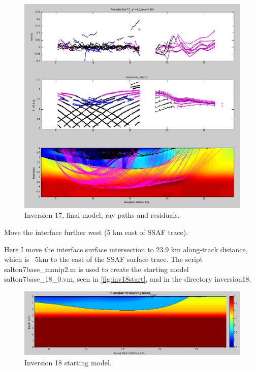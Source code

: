 \documentclass[fontsize=11pt, %
                             paper=a4, %
                             twoside, %
                             captions=tableheading,
                             index=totoc,
                             hyperref]{labbook}
\begin{document}
\begin{addmargin}[4cm]{0cm}
\begin{figure}[h!]
\raggedleft
\includegraphics[scale=0.5,keepaspectratio=true]{figs/Inv17FinRay.png}
\caption{Inversion 17, final model, ray paths and residuals.}
\label{fig:inv17ray}
\end{figure}



\clearpage{}


Move the interface further west (5 km east of SSAF trace).

Here I move the interface surface intersection to 23.9 km along-track distance, which is ~5km to the east of the SSAF surface trace.  The script salton7base\_manip2.m is used to create the starting model salton7base\_18\_0.vm, seen in \autoref{fig:inv18start}, and in the directory inversion18.  

\begin{figure}[h!]
\raggedleft
\includegraphics[scale=0.4,keepaspectratio=true]{figs/Inv18_0.png}
\caption{Inversion 18 starting model.}
\label{fig:inv18start}
\end{figure}


\end{addmargin}
\end{document}
